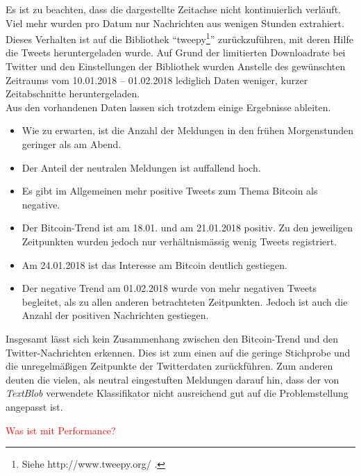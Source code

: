Es ist zu beachten, dass die dargestellte Zeitachse nicht kontinuierlich verläuft. Viel mehr wurden pro Datum nur Nachrichten aus wenigen Stunden extrahiert. Dieses Verhalten ist auf die Bibliothek \enquote{tweepy\footnote{Siehe http://www.tweepy.org/ .}} zur\"uckzuf\"uhren, mit deren Hilfe die Tweets heruntergeladen wurde. Auf Grund der limitierten Downloadrate bei Twitter und den Einstellungen der Bibliothek wurden Anstelle des gew\"unschten Zeitraums vom 10.01.2018 -- 01.02.2018 lediglich Daten weniger, kurzer Zeitabschnitte heruntergeladen.\\
Aus den vorhandenen Daten lassen sich trotzdem einige Ergebnisse ableiten. 
\begin{itemize}
	\item Wie zu erwarten, ist die Anzahl der Meldungen in den fr\"uhen Morgenstunden geringer als am Abend.
	\item Der Anteil der neutralen Meldungen ist auffallend hoch. 
	\item Es gibt im Allgemeinen mehr positive Tweets zum Thema Bitcoin als negative.
	\item Der Bitcoin-Trend ist am 18.01. und am 21.01.2018 positiv. Zu den jeweiligen Zeitpunkten wurden jedoch nur verh\"altnism\"assig wenig Tweets registriert.
	\item Am 24.01.2018 ist das Interesse am Bitcoin deutlich gestiegen.
	\item Der negative Trend am 01.02.2018 wurde von mehr negativen Tweets begleitet, als zu allen anderen betrachteten Zeitpunkten. Jedoch ist auch die Anzahl der positiven Nachrichten gestiegen.
\end{itemize}

Insgesamt l\"asst sich kein Zusammenhang zwischen den Bitcoin-Trend und den Twitter-Nachrichten erkennen. Dies ist zum einen auf die geringe Stichprobe und die unregelm\"a{\ss}igen Zeitpunkte der Twitterdaten zur\"uckf\"uhren. Zum anderen deuten die vielen, als neutral eingestuften Meldungen darauf hin, dass der von \textit{TextBlob} verwendete Klassifikator nicht ausreichend gut auf die Problemstellung angepasst ist. 




\textcolor{red}{Was ist mit Performance?}